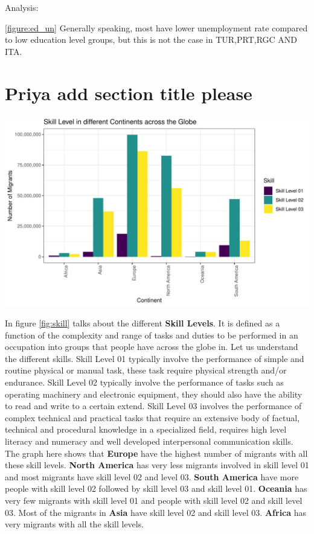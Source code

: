 \documentclass[11pt,a4paper,]{article}
\let\origfigure\figure
\let\endorigfigure\endfigure
\renewenvironment{figure}[1][2] {
    \expandafter\origfigure\expandafter[H]
} {
    \endorigfigure
}%
\begin{document}
Analysis:

\ref{figure:ed_un} Generally speaking, most have lower unemployment rate compared to low education level groups, but this is not the case in TUR,PRT,RGC AND ITA.

\pagebreak

\section* {Priya add section title please}

\begin{figure}
\centering
\includegraphics{ETC5513assignment4_files/figure-latex/skill-1.pdf}
\caption{\label{fig:skill}Types of Skill}
\end{figure}

In figure \ref{fig:skill} talks about the different \textbf{Skill Levels}. It is defined as a function of the complexity and range of tasks and duties to be performed in an occupation into groups that people have across the globe in. Let us understand the different skills. Skill Level 01 typically involve the performance of simple and routine physical or manual task, these task require physical strength and/or endurance. Skill Level 02 typically involve the performance of tasks such as operating machinery and electronic equipment, they should also have the ability to read and write to a certain extend. Skill Level 03 involves the performance of complex technical and practical tasks that require an extensive body of factual, technical and procedural knowledge in a specialized field, requires high level literacy and numeracy and well developed interpersonal communication skills. The graph here shows that \textbf{Europe} have the highest number of migrants with all these skill levels. \textbf{North America} has very less migrants involved in skill level 01 and most migrants have skill level 02 and level 03. \textbf{South America} have more people with skill level 02 followed by skill level 03 and skill level 01. \textbf{Oceania} has very few migrants with skill level 01 and people with skill level 02 and skill level 03. Most of the migrants in \textbf{Asia} have skill level 02 and skill level 03. \textbf{Africa} has very migrants with all the skill levels.
\end{document}
